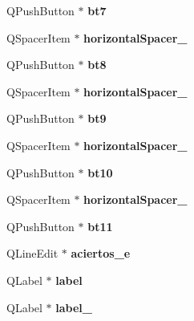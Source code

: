 \begin{DoxyCompactItemize}
Q\+Push\+Button $\ast$ {\bfseries bt7}
\item 
\mbox{\label{class_ui__main__app_a676e9227dc1bdacfec7acc85502748a6}} 
Q\+Spacer\+Item $\ast$ {\bfseries horizontal\+Spacer\+\_}
\item 
\mbox{\label{class_ui__main__app_a4fb3f0a3cc341cb686a8ab2d5fd1e724}} 
Q\+Push\+Button $\ast$ {\bfseries bt8}
\item 
\mbox{\label{class_ui__main__app_a59554266a396dc13c76ccc0504f01170}} 
Q\+Spacer\+Item $\ast$ {\bfseries horizontal\+Spacer\+\_}
\item 
\mbox{\label{class_ui__main__app_a480446a9c3878574cdd4c0d6ace45da1}} 
Q\+Push\+Button $\ast$ {\bfseries bt9}
\item 
\mbox{\label{class_ui__main__app_ab5b061010cb2ef2a2b19342e26843473}} 
Q\+Spacer\+Item $\ast$ {\bfseries horizontal\+Spacer\+\_}
\item 
\mbox{\label{class_ui__main__app_ac385a45dc76dcb3b4e9c7d7c225723ef}} 
Q\+Push\+Button $\ast$ {\bfseries bt10}
\item 
\mbox{\label{class_ui__main__app_afaeb439578667bf5a1103f5a02215837}} 
Q\+Spacer\+Item $\ast$ {\bfseries horizontal\+Spacer\+\_}
\item 
\mbox{\label{class_ui__main__app_a7aadf63dc799f006e318943cf54a0ac0}} 
Q\+Push\+Button $\ast$ {\bfseries bt11}
\item 
\mbox{\label{class_ui__main__app_ad1c28e30d81ff19b625290f7a9798a94}} 
Q\+Line\+Edit $\ast$ {\bfseries aciertos\+\_\+e}
\item 
\mbox{\label{class_ui__main__app_aeb94625a8c1c4376ae509aec3a50ab41}} 
Q\+Label $\ast$ {\bfseries label}
\item 
\mbox{\label{class_ui__main__app_afd886e7ada9f507e47537dd1cf6d6b4f}} 
Q\+Label $\ast$ {\bfseries label\+\_}
\item 

\end{DoxyCompactItemize}

